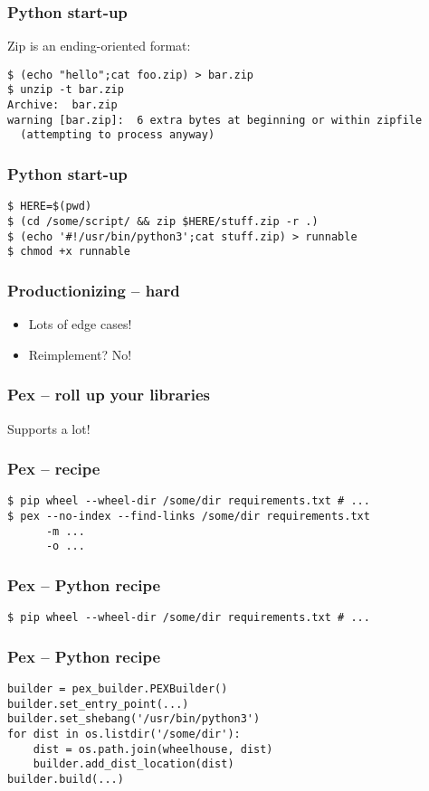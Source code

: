 \begin{frame}[fragile]
\frametitle{Python start-up}
Zip is an ending-oriented format:
\begin{lstlisting}
$ (echo "hello";cat foo.zip) > bar.zip
$ unzip -t bar.zip 
Archive:  bar.zip
warning [bar.zip]:  6 extra bytes at beginning or within zipfile
  (attempting to process anyway)
\end{lstlisting}
\end{frame}

\begin{frame}[fragile]
\frametitle{Python start-up}
\begin{lstlisting}
$ HERE=$(pwd)
$ (cd /some/script/ && zip $HERE/stuff.zip -r .)
$ (echo '#!/usr/bin/python3';cat stuff.zip) > runnable
$ chmod +x runnable
\end{lstlisting}
\end{frame}

\begin{frame}[fragile]
\frametitle{Productionizing -- hard}
\begin{itemize}
\item Lots of edge cases!
\item Reimplement? No!
\end{itemize}
\end{frame}

\begin{frame}[fragile]
\frametitle{Pex -- roll up your libraries}
Supports a lot!
\end{frame}

\begin{frame}[fragile]
\frametitle{Pex -- recipe}
\begin{lstlisting}
$ pip wheel --wheel-dir /some/dir requirements.txt # ...
$ pex --no-index --find-links /some/dir requirements.txt
      -m ...
      -o ...
\end{lstlisting}
\end{frame}

\begin{frame}[fragile]
\frametitle{Pex -- Python recipe}
\begin{lstlisting}
$ pip wheel --wheel-dir /some/dir requirements.txt # ...
\end{lstlisting}
\end{frame}

\begin{frame}[fragile]
\frametitle{Pex -- Python recipe}
\begin{lstlisting}
builder = pex_builder.PEXBuilder()
builder.set_entry_point(...)
builder.set_shebang('/usr/bin/python3')
for dist in os.listdir('/some/dir'):
    dist = os.path.join(wheelhouse, dist)
    builder.add_dist_location(dist)
builder.build(...)
\end{lstlisting}
\end{frame}

